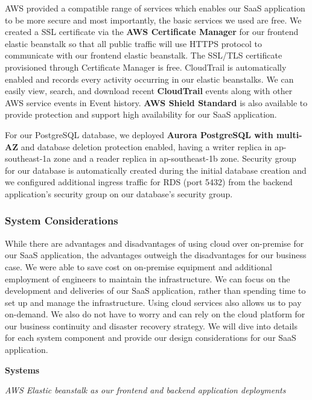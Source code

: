 \documentclass[12pt,a4paper]{article}
\begin{document}
        AWS provided a compatible range of services which enables our SaaS application to be more secure and most importantly, the basic services we used are free. We created a SSL certificate via the \textbf{AWS Certificate Manager} for our frontend elastic beanstalk so that all public traffic will use HTTPS protocol to communicate with our frontend elastic beanstalk. The SSL/TLS certificate provisioned through Certificate Manager is free. CloudTrail is automatically enabled and records every activity occurring in our elastic beanstalks. We can easily view, search, and download recent \textbf{CloudTrail} events along with other AWS service events in Event history. \textbf{AWS Shield Standard} is also available to provide protection and support high availability for our SaaS application. 
        
        For our PostgreSQL database, we deployed \textbf{Aurora PostgreSQL with multi-AZ} and database deletion protection enabled, having a writer replica in ap-southeast-1a zone and a  reader replica in ap-southeast-1b zone. Security group for our database is automatically created during the initial database creation and we configured additional ingress traffic for RDS (port 5432) from the backend application’s security group on our database’s security group. 
        
        \subsubsection{System Considerations}
        
        While there are advantages and disadvantages of using cloud over on-premise for our SaaS application, the advantages outweigh the disadvantages for our business case. We were able to save cost on on-premise equipment and additional employment of engineers to maintain the infrastructure. We can focus on the development and deliveries of our SaaS application, rather than spending time to set up and manage the infrastructure. Using cloud services also allows us to pay on-demand. We also do not have to worry and can rely on the cloud platform for our business continuity and disaster recovery strategy. We will dive into details for each system component and provide our design considerations for our SaaS application.
        
            \textbf{Systems}
            
            \textit{AWS Elastic beanstalk as our frontend and backend application deployments}
            
\end{document}
